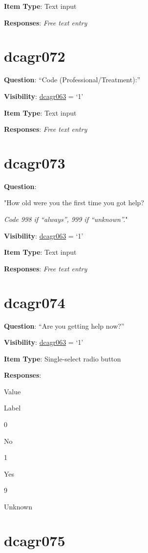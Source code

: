 \documentclass[]{book}
\begin{document}
\textbf{Item Type}: Text input

\textbf{Responses}: \emph{Free text entry}

\hypertarget{dcagr072}{%
\section{dcagr072}\label{dcagr072}}

\textbf{Question}: ``Code (Professional/Treatment):''

\textbf{Visibility}: \protect\hyperlink{dcagr063}{dcagr063} = `1'

\textbf{Item Type}: Text input

\textbf{Responses}: \emph{Free text entry}

\hypertarget{dcagr073}{%
\section{dcagr073}\label{dcagr073}}

\textbf{Question}:

"How old were you the first time you got help?

\emph{Code 998 if ``always'', 999 if ``unknown''.}"

\textbf{Visibility}: \protect\hyperlink{dcagr063}{dcagr063} = `1'

\textbf{Item Type}: Text input

\textbf{Responses}: \emph{Free text entry}

\hypertarget{dcagr074}{%
\section{dcagr074}\label{dcagr074}}

\textbf{Question}: ``Are you getting help now?''

\textbf{Visibility}: \protect\hyperlink{dcagr063}{dcagr063} = `1'

\textbf{Item Type}: Single-select radio button

\textbf{Responses}:

Value

Label

0

No

1

Yes

9

Unknown

\hypertarget{dcagr075}{%
\section{dcagr075}\label{dcagr075}}
\end{document}
